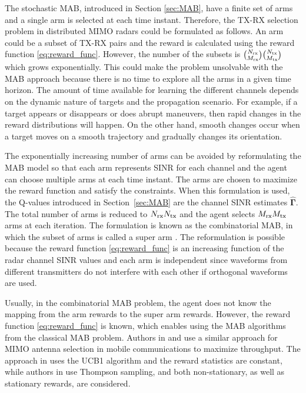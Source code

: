 \documentclass[english, 12pt, a4paper, elec, utf8, a-1b, online]{aaltothesis}
\numberwithin{equation}{section}
\newcommand{\vsinrb}{\widehat{\boldsymbol{\Gamma}}}
\begin{document}
The stochastic MAB, introduced in Section \ref{sec:MAB}, have a finite set of arms and a single arm is selected at each time instant.
Therefore, the TX-RX selection problem in distributed MIMO radars could be formulated as follows.
An arm could be a subset of TX-RX pairs and the reward is calculated using the reward function \eqref{eq:reward_func}.
However, the number of the subsets is $\binom{{N_{\text{rx}}}}{{M_{\text{rx}}}}\binom{{N_{\text{tx}}}}{{M_{\text{tx}}}}$ which grows exponentially. This could make the problem unsolvable with the MAB approach because there is no time to explore all the arms in a given time horizon.
The amount of time available for learning the different channels depends on the dynamic nature of targets and the propagation scenario.
For example, if a target appears or disappears or does abrupt maneuvers, then rapid changes in the reward distributions will happen. 
On the other hand, smooth changes occur when a target moves on a smooth trajectory and gradually changes its orientation.

The exponentially increasing number of arms can be avoided by reformulating the MAB model so that each arm represents SINR for each channel and the agent can choose multiple arms at each time instant.
The arms are chosen to maximize the reward function and satisfy the constraints.
When this formulation is used, the Q-values introduced in Section~\ref{sec:MAB} are the channel SINR estimates $\vsinrb$.
The total number of arms is reduced to ${N_{\text{rx}}}{N_{\text{tx}}}$ and the agent selects ${M_{\text{rx}}}{M_{\text{tx}}}$ arms at each iteration.
The formulation is known as the combinatorial MAB, in which the subset of arms is called a super arm \cite{Chen2014}.
The reformulation is possible because the reward function \eqref{eq:reward_func} is an increasing function of the radar channel SINR values and each arm is independent since waveforms from different transmitters do not interfere with each other if orthogonal waveforms are used.

Usually, in the combinatorial MAB problem, the agent does not know the mapping from the arm rewards to the super arm rewards.
However, the reward function \eqref{eq:reward_func} is known, which enables using the MAB algorithms from the classical MAB problem.
Authors in \cite{Mukherjee2012} and \cite{Kuai2019} use a similar approach for MIMO antenna selection in mobile communications to maximize throughput.
The approach in \cite{Mukherjee2012} uses the UCB1 algorithm and the reward statistics are constant, while authors in \cite{Kuai2019} use Thompson sampling, and both non-stationary, as well as stationary rewards, are considered.
\end{document}
